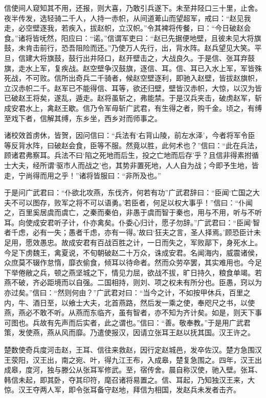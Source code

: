 \documentclass[12pt,UTF8]{ctexbook}
\begin{document}
信使间人窥知其不用，还报，则大喜，乃敢引兵遂下。未至井陉口三十里，止舍。夜半传发，选轻骑二千人，人持一赤帜，从间道萆山而望超军，戒曰：“赵见我走，必空壁逐我，若疾入，拔赵帜，立汉帜。”令其裨将传餐，曰：“今日破赵会食。”诸将皆呒然，阳应曰：“诺。”信谓军吏曰：“赵已先据便地壁，且彼未见大将旗鼓，未肯击前行，恐吾阻险而还。”乃使万人先行，出，背水阵。赵兵望见大笑。平旦，信建大将旗鼓，鼓行出井陉口，赵开壁击之，大战良久。于是信、张耳弃鼓旗，走水上军，复疾战。赵空壁争汉鼓旗，逐信、耳。信、耳已入水上军，军皆殊死战，不可败。信所出奇兵二千骑者，候赵空壁逐利，即驰入赵壁，皆拔赵旗帜，立汉赤帜二千。赵军已不能得信、耳等，欲还归壁，壁皆汉赤帜，大惊，以汉为皆已破赵王将矣，遂乱，遁走。赵将虽斩之，弗能禁。于是汉兵夹击，破虏赵军，斩成安君水上，禽赵王歇。信乃令军毋斩广武君，有生得之者，购千金。顷之，有缚至戏下者，信解其缚，东乡坐，西乡对而师事之。



诸校效首虏休，皆贺，因问信曰：“兵法有‘右背山陵，前左水泽’，今者将军令臣等反背水阵，曰破赵会食，臣等不服。然竟以胜，此何术也？”信曰：“此在兵法，顾诸君弗察耳。兵法不曰‘陷之死地而后生，投之亡地而后存’乎？且信非得素拊循士大夫，经所谓‘驱市人而战之’也，其势非置死地，人人自为战；今即予生地，皆走，宁尚得而用之乎！”诸将皆服曰：“非所及也。”



于是问广武君曰：“仆欲北攻燕，东伐齐，何若有功”广武君辞曰：“臣闻‘亡国之大夫不可以图存，败军之将不可以语勇。’若臣者，何足以权大事乎！”信曰：“仆闻之，百里奚居虞而虞亡，之秦而秦伯，非愚于虞而智于秦也，用与不用，听与不听耳。向使成安君听子计，仆亦禽矣。仆委心归计，愿子勿辞。”广武君曰：“臣闻‘智者千虑，必有一失；愚者千虑，亦有一得。’故曰‘狂夫之言，圣人择焉。’顾恐臣计未足用，愿效愚忠。故成安君有百战百胜之计，一日而失之，军败鄗下，身死水上。今足下虏魏王，禽夏说，不旬朝破赵二十万众，诛成安君。名闻海内，威震诸侯，众庶莫不辍作怠惰，靡衣偷食，倾耳以待命者。然而众劳卒罢，其实难用也。今足下举倦敝之兵，顿之燕坚城之下，情见力屈，欲战不拔，旷日持久，粮食单竭。若燕不破，齐必距境而以自强。二国相持，则刘、项之权未有所分也。臣愚，窍以为亦过矣。”信曰：“然则何由？”广武君对曰：“当今之计，不如按甲休兵，百里之内，牛、酒日至，以飨士大夫，北首燕路，然后发一乘之使，奉咫尺之书，以使燕，燕必不敢不听。从燕而东临齐，虽有智者，亦不知为齐计矣。如是，则天下事可图也。兵故有先声而后实者，此之谓也。”信曰：“善。敬奉教。”于是用广武君策，发使燕，燕从风而靡。乃遣使报汉，因请立张耳王赵以抚其国。汉王许之。



楚数使奇兵度河击赵，王耳、信往来救赵，因行定赵城邑，发卒佐汉。楚方急围汉王荥阳，汉王出，南之宛、叶，得九江王布，入成皋，楚复急围之。四年，汉王出成皋，度河，独与滕公从张耳军修武。至，宿传舍。晨自称汉使，驰入壁。张耳、韩信未起，即其卧，夺其印符，麾召诸将易置之。信、耳起，乃知独汉王来，大惊。汉王夺两人军，即令张耳备守赵地，拜信为相国，发赵兵未发者击齐。
\end{document}
